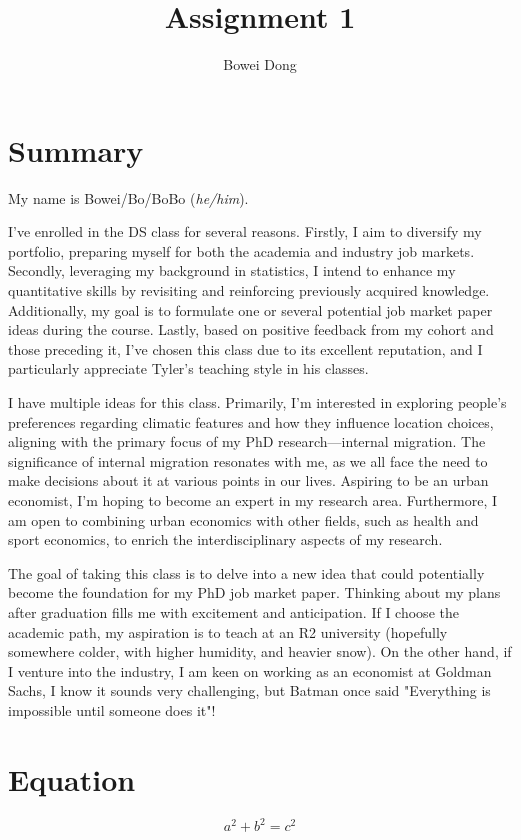 \documentclass{article}
\title{Assignment 1}
\author{Bowei Dong }
\date{}
\begin{document}
\maketitle

\section*{Summary}

My name is Bowei/Bo/BoBo (\textit{he/him}). 

I've enrolled in the DS class for several reasons. Firstly, I aim to diversify my portfolio, preparing myself for both the academia and industry job markets. Secondly, leveraging my background in statistics, I intend to enhance my quantitative skills by revisiting and reinforcing previously acquired knowledge. Additionally, my goal is to formulate one or several potential job market paper ideas during the course. Lastly, based on positive feedback from my cohort and those preceding it, I've chosen this class due to its excellent reputation, and I particularly appreciate Tyler's teaching style in his classes.

I have multiple ideas for this class. Primarily, I'm interested in exploring people's preferences regarding climatic features and how they influence location choices, aligning with the primary focus of my PhD research—internal migration. The significance of internal migration resonates with me, as we all face the need to make decisions about it at various points in our lives. Aspiring to be an urban economist, I'm hoping to become an expert in my research area. Furthermore, I am open to combining urban economics with other fields, such as health and sport economics, to enrich the interdisciplinary aspects of my research.

The goal of taking this class is to delve into a new idea that could potentially become the foundation for my PhD job market paper. Thinking about my plans after graduation fills me with excitement and anticipation. If I choose the academic path, my aspiration is to teach at an R2 university (hopefully somewhere colder, with higher humidity, and heavier snow). On the other hand, if I venture into the industry, I am keen on working as an economist at Goldman Sachs, I know it sounds very challenging, but Batman once said "Everything is impossible until someone does it"!

\section*{Equation}
\begin{equation}
    a^2+b^2=c^2
\end{equation}
\end{document}
